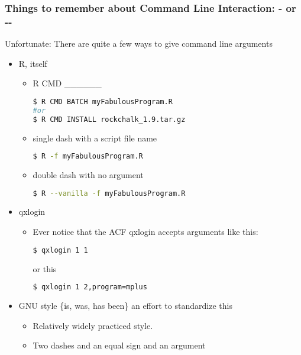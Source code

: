 \documentclass[English]{beamer}
\begin{document}
\begin{frame}
  \frametitle{Things to remember about Command Line Interaction: - or -{}-}

  Unfortunate: There are quite a few ways to give command line
  arguments

  \begin{itemize}
  \item R, itself
    
    \begin{itemize}
    \item R CMD \_\_\_<one of: BATCH, INSTALL, build, check, Sweave, Stangle>\_\_\_

      \begin{lstlisting}[basicstyle={\small},breaklines=true,language=bash]
$ R CMD BATCH myFabulousProgram.R
#or
$ R CMD INSTALL rockchalk_1.9.tar.gz
\end{lstlisting}  

\item single dash with a script file name 
\begin{lstlisting}[basicstyle={\small},breaklines=true,language=bash]
$ R -f myFabulousProgram.R
\end{lstlisting}  

\item double dash with no argument
\begin{lstlisting}[basicstyle={\small},breaklines=true,language=bash]
$ R --vanilla -f myFabulousProgram.R
\end{lstlisting}  
\end{itemize}

\item qxlogin
    \begin{itemize}
      \item Ever notice that the ACF qxlogin accepts arguments like this:
\begin{lstlisting}[basicstyle={\small},breaklines=true,language=bash]
$ qxlogin 1 1
\end{lstlisting}  

or this

\begin{lstlisting}[basicstyle={\small},breaklines=true,language=bash]
$ qxlogin 1 2,program=mplus
\end{lstlisting}  
\end{itemize}
  \item GNU style \{is, was, has been\} an effort to standardize this
    \begin{itemize}
    \item Relatively widely practiced style.
    \item Two dashes and an equal sign and an argument
        

\end{itemize}
\end{itemize}
\end{frame}
\end{document}
